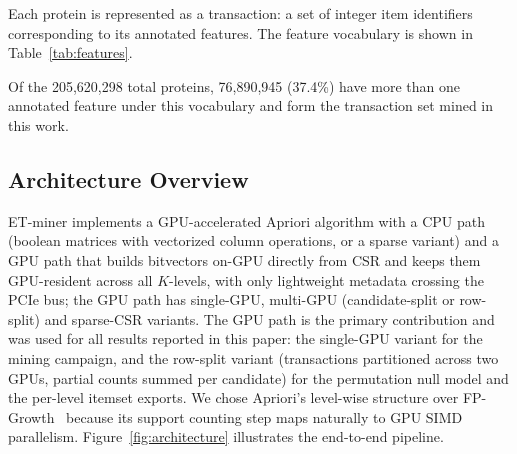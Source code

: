 \documentclass[10pt,a4paper,twocolumn]{article}
\begin{document}
Each protein is represented as a transaction: a set of integer item identifiers corresponding to its annotated features. The feature vocabulary is shown in Table~\ref{tab:features}.

\begin{table}[h]
\caption{Feature vocabulary composition: 1,006 items are defined (6 pLDDT confidence bins, 500 Pfam domains, 500 GO terms) and 1,002 pass the support threshold of 8 proteins (all 1,000 Pfam/GO items plus 2 pLDDT bins; the other 4 pLDDT bins are empty).}
\label{tab:features}
\centering
{}
\end{table}

Of the 205,620,298 total proteins, 76,890,945 (37.4\%) have more than one annotated feature under this vocabulary and form the transaction set mined in this work.

\subsection{Architecture Overview}

ET-miner implements a GPU-accelerated Apriori algorithm with a CPU path (boolean matrices with vectorized column operations, or a sparse variant) and a GPU path that builds bitvectors on-GPU directly from CSR and keeps them GPU-resident across all $K$-levels, with only lightweight metadata crossing the PCIe bus; the GPU path has single-GPU, multi-GPU (candidate-split or row-split) and sparse-CSR variants. The GPU path is the primary contribution and was used for all results reported in this paper: the single-GPU variant for the mining campaign, and the row-split variant (transactions partitioned across two GPUs, partial counts summed per candidate) for the permutation null model and the per-level itemset exports. We chose Apriori's level-wise structure over FP-Growth~\cite{han2000} because its support counting step maps naturally to GPU SIMD parallelism. Figure~\ref{fig:architecture} illustrates the end-to-end pipeline.
\end{document}
